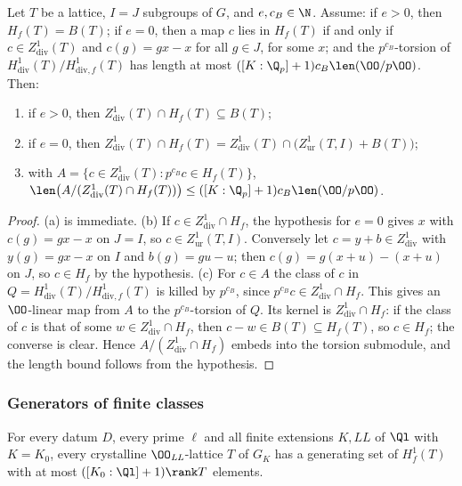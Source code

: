 \begin{lemma}\label{pf:linkN-sel:tbe}
Let $T$ be a lattice, $I=J$ subgroups of $G$, and $e,c_B\in\N$. Assume: if $e>0$, then $H_f(T)=B(T)$; if $e=0$, then a map $c$ lies in
$H_f(T)$ if and only if $c\in Z^1_{\mathrm{div}}(T)$ and $c(g)=gx-x$ for all $g\in J$, for some $x$; and the $p^{c_B}$-torsion of
$H^1_{\mathrm{div}}(T)/H^1_{\mathrm{div},f}(T)$ has length at most $([K:\Q_p]+1)c_B\len(\OO/p\OO)$. Then:
\begin{enumerate}[label=(\alph*)]
\item if $e>0$, then $Z^1_{\mathrm{div}}(T)\cap H_f(T)\subseteq B(T)$;
\item if $e=0$, then $Z^1_{\mathrm{div}}(T)\cap H_f(T)=Z^1_{\mathrm{div}}(T)\cap\bigl(Z^1_{\mathrm{ur}}(T,I)+B(T)\bigr)$;
\item with $A=\{c\in Z^1_{\mathrm{div}}(T):p^{c_B}c\in H_f(T)\}$, $\len\bigl(A/(Z^1_{\mathrm{div}}(T)\cap H_f(T))\bigr)\le([K:\Q_p]+1)c_B\len(\OO/p\OO)$.
\end{enumerate}
\end{lemma}

\begin{proof}
(a) is immediate. (b) If $c\in Z^1_{\mathrm{div}}\cap H_f$, the hypothesis for $e=0$ gives $x$ with $c(g)=gx-x$ on $J=I$, so $c\in Z^1_{\mathrm{ur}}(T,I)$.
Conversely let $c=y+b\in Z^1_{\mathrm{div}}$ with $y(g)=gx-x$ on $I$ and $b(g)=gu-u$; then $c(g)=g(x+u)-(x+u)$ on $J$, so $c\in H_f$ by the
hypothesis. (c) For $c\in A$ the class of $c$ in $Q=H^1_{\mathrm{div}}(T)/H^1_{\mathrm{div},f}(T)$ is killed by $p^{c_B}$, since $p^{c_B}c\in
Z^1_{\mathrm{div}}\cap H_f$. This gives an $\OO$-linear map from $A$ to the $p^{c_B}$-torsion of $Q$. Its kernel is $Z^1_{\mathrm{div}}\cap H_f$:
if the class of $c$ is that of some $w\in Z^1_{\mathrm{div}}\cap H_f$, then $c-w\in B(T)\subseteq H_f(T)$, so $c\in H_f$; the converse is clear.
Hence $A/(Z^1_{\mathrm{div}}\cap H_f)$ embeds into the torsion submodule, and the length bound follows from the hypothesis.
\end{proof}

\subsubsection{Generators of finite classes}

\begin{proposition}\label{pf:linkN-sel:gen}
For every datum $D$, every prime $\ell$ and all finite extensions $K,\mathit{LL}$ of $\Ql$ with $K=K_0$, every crystalline
$\OO_{\mathit{LL}}$-lattice $T$ of $G_K$ has a generating set of $H^1_f(T)$ with at most $([K_0:\Ql]+1)\rank T$ elements.
\end{proposition}

